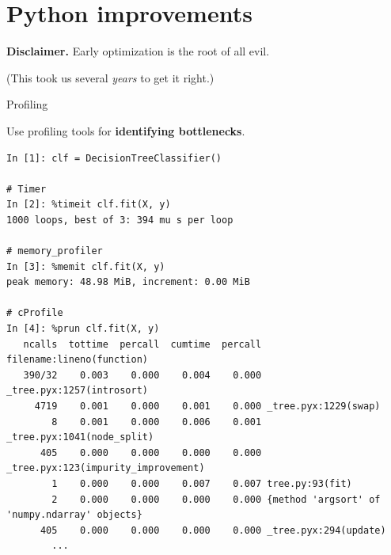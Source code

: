 \documentclass{beamer}
\begin{document}

\section{Python improvements}




\begin{frame}
\begin{center}
{\color{red} {\bf Disclaimer.} Early optimization is the root of all evil.}

\vspace{1cm}

(This took us several \textit{years} to get it right.)
\end{center}
\end{frame}

\begin{frame}[fragile]{Profiling}

Use profiling tools for {\bf identifying bottlenecks}.

\begin{verbatim}
In [1]: clf = DecisionTreeClassifier()

# Timer
In [2]: %timeit clf.fit(X, y)
1000 loops, best of 3: 394 mu s per loop

# memory_profiler
In [3]: %memit clf.fit(X, y)
peak memory: 48.98 MiB, increment: 0.00 MiB

# cProfile
In [4]: %prun clf.fit(X, y)
   ncalls  tottime  percall  cumtime  percall filename:lineno(function)
   390/32    0.003    0.000    0.004    0.000 _tree.pyx:1257(introsort)
     4719    0.001    0.000    0.001    0.000 _tree.pyx:1229(swap)
        8    0.001    0.000    0.006    0.001 _tree.pyx:1041(node_split)
      405    0.000    0.000    0.000    0.000 _tree.pyx:123(impurity_improvement)
        1    0.000    0.000    0.007    0.007 tree.py:93(fit)
        2    0.000    0.000    0.000    0.000 {method 'argsort' of 'numpy.ndarray' objects}
      405    0.000    0.000    0.000    0.000 _tree.pyx:294(update)
        ...
\end{verbatim}


\end{frame}
\end{document}
